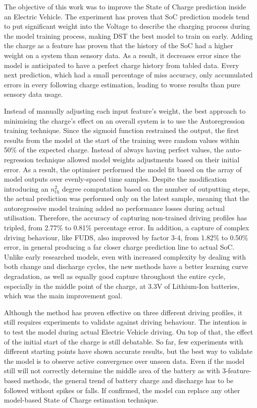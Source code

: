 {The objective of this work was to improve the State of Charge prediction inside an Electric Vehicle.}
The experiment has proven that SoC prediction models tend to put significant weight into the Voltage to describe the charging process during the model training process, making DST the best model to train on early.
Adding the charge as a feature has proven that the history of the SoC had a higher weight on a system than sensory data.
As a result, it decreases error since the model is anticipated to have a perfect charge history from tabled data.
Every next prediction, which had a small percentage of miss accuracy, only accumulated errors in every following charge estimation, leading to worse results than pure sensory data usage.

%
%
Instead of manually adjusting each input feature's weight, the best approach to minimising the charge's effect on an overall system is to use the Autoregression training technique. 
Since the sigmoid function restrained the output, the first results from the model at the start of the training were random values within 50\% of the expected charge.
Instead of always having perfect values, the auto-regression technique allowed model weights adjustments based on their initial error.
As a result, the optimiser performed the model fit based on the array of model outputs over evenly-spaced time samples.
Despite the modification introducing an $n_{th}^{2}$ degree computation based on the number of outputting steps, the actual prediction was performed only on the latest sample, meaning that the autoregressive model training added no performance losses during actual utilisation.
Therefore, the accuracy of capturing non-trained driving profiles has tripled, from 2.77\% to 0.81\% percentage error.
In addition, a capture of complex driving behaviour, like FUDS, also improved by factor 3-4, from 1.82\% to 0.50\% error, in general producing a far closer charge prediction line to actual SoC.
Unlike early researched models, even with increased complexity by dealing with both change and discharge cycles, the new methods have a better learning curve degradation, as well as equally good capture throughout the entire cycle, especially in the middle point of the charge, at 3.3V of Lithium-Ion batteries, which was the main improvement goal.

%
%
Although the method has proven effective on three different driving profiles, it still requires experiments to validate against driving behaviour.
The intention is to test the model during actual Electric Vehicle driving.
On top of that, the effect of the initial start of the charge is still debatable.
So far, few experiments with different starting points have shown accurate results, but the best way to validate the model is to observe active convergence over unseen data.
Even if the model still will not correctly determine the middle area of the battery as with 3-feature-based methods, the general trend of battery charge and discharge has to be followed without spikes or falls.
If confirmed, the model can replace any other model-based State of Charge estimation technique.
